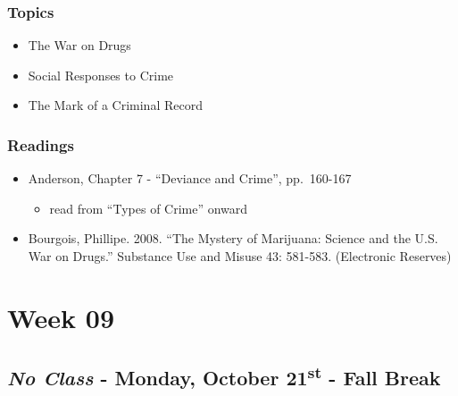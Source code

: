 \documentclass[]{book}
\providecommand{\tightlist}{%
  \setlength{\itemsep}{0pt}\setlength{\parskip}{0pt}}
\begin{document}
\hypertarget{topics-15}{%
\subsubsection*{Topics}\label{topics-15}}

\begin{itemize}
\tightlist
\item
  The War on Drugs
\item
  Social Responses to Crime
\item
  The Mark of a Criminal Record
\end{itemize}

\hypertarget{readings-14}{%
\subsubsection*{Readings}\label{readings-14}}

\begin{itemize}
\tightlist
\item
  Anderson, Chapter 7 - ``Deviance and Crime'', pp.~160-167

  \begin{itemize}
  \tightlist
  \item
    read from ``Types of Crime'' onward
  \end{itemize}
\item
  Bourgois, Phillipe. 2008. ``The Mystery of Marijuana: Science and the U.S. War on Drugs.'' Substance Use and Misuse 43: 581-583. (Electronic Reserves)
\end{itemize}

\hypertarget{week-09}{%
\section*{Week 09}\label{week-09}}

\hypertarget{no-class---monday-october-21st---fall-break}{%
\subsection*{\texorpdfstring{\emph{No Class} - Monday, October 21\textsuperscript{st} - Fall Break}{No Class - Monday, October 21st - Fall Break}}\label{no-class---monday-october-21st---fall-break}}
\end{document}
